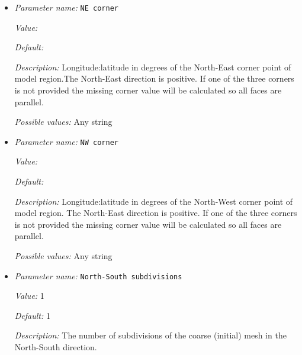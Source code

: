 \begin{itemize}
{\it Default:} 8.1819190842622e-2


{\it Description:} Eccentricity of the ellipsoid. Zero is a perfect sphere, default (8.1819190842622e-2) is WGS84.


{\it Possible values:} A floating point number $v$ such that $0 \leq v \leq \text{MAX\_DOUBLE}$
\item {\it Parameter name:} {\tt NE corner}
\label{parameters:Geometry model/Ellipsoidal chunk/NE corner}
\label{parameters:Geometry_20model/Ellipsoidal_20chunk/NE_20corner}


{\it Value:} 


{\it Default:} 


{\it Description:} Longitude:latitude in degrees of the North-East corner point of model region.The North-East direction is positive. If one of the three corners is not provided the missing corner value will be calculated so all faces are parallel.


{\it Possible values:} Any string
\item {\it Parameter name:} {\tt NW corner}
\label{parameters:Geometry model/Ellipsoidal chunk/NW corner}
\label{parameters:Geometry_20model/Ellipsoidal_20chunk/NW_20corner}


{\it Value:} 


{\it Default:} 


{\it Description:} Longitude:latitude in degrees of the North-West corner point of model region. The North-East direction is positive. If one of the three corners is not provided the missing corner value will be calculated so all faces are parallel.


{\it Possible values:} Any string
\item {\it Parameter name:} {\tt North-South subdivisions}
\label{parameters:Geometry model/Ellipsoidal chunk/North_2dSouth subdivisions}
\label{parameters:Geometry_20model/Ellipsoidal_20chunk/North_2dSouth_20subdivisions}


{\it Value:} 1


{\it Default:} 1


{\it Description:} The number of subdivisions of the coarse (initial) mesh in the North-South direction.



\end{itemize}
